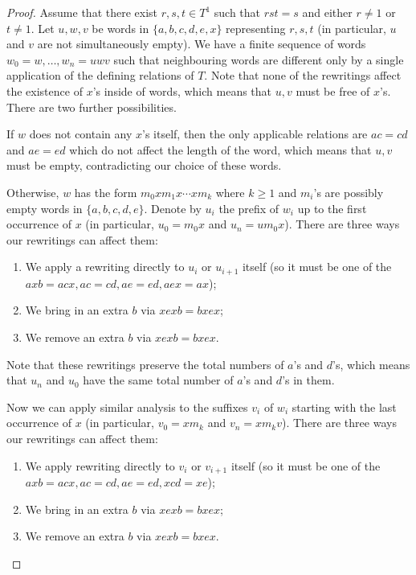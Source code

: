 \documentclass{article}
\theoremstyle{definition}
\begin{document}
\begin{proof}
Assume that there exist $r,s,t \in T^1$ such that $rst=s$ and either $r \neq 1$ or $t \neq 1$. Let $u,w,v$ be words in $\{a,b,c,d,e,x \}$ representing $r,s,t$ (in particular, $u$ and $v$ are not simultaneously empty). We have a finite sequence of words $w_0 = w, \ldots, w_n = u w v$ such that neighbouring words are different only by a single application of the defining relations of $T$. Note that none of the rewritings affect the existence of $x$'s inside of words, which means that $u,v$ must be free of $x$'s. There are two further possibilities.

If $w$ does not contain any $x$'s itself, then the only applicable relations are $ac = cd$ and $ae = ed$ which do not affect the length of the word, which means that $u,v$ must be empty, contradicting our choice of these words.

Otherwise, $w$ has the form $m_0 x m_1 x \cdots x m_k$ where $k \ge 1$ and $m_i$'s are possibly empty words in $\{a,b,c,d,e\}$. Denote by $u_i$ the prefix of $w_i$ up to the first occurrence of $x$ (in particular, $u_0 = m_0 x$ and $u_n = u m_0 x$). There are three ways our rewritings can affect them:

\begin{enumerate}
\item We apply a rewriting directly to $u_i$ or $u_{i+1}$ itself (so it must be one of the $axb = acx, ac=cd, ae = ed, aex = ax$);
\item We bring in an extra $b$ via $xexb = bxex$;
\item We remove an extra $b$ via $xexb = bxex$.
\end{enumerate}

Note that these rewritings preserve the total numbers of $a$'s and $d$'s, which means that $u_n$ and $u_0$ have the same total number of $a$'s and $d$'s in them.

Now we can apply similar analysis to the suffixes $v_i$ of $w_i$ starting with the last occurrence of $x$ (in particular, $v_0 =x m_k$ and $v_n = x m_k v$). There are three ways our rewritings can affect them:

\begin{enumerate}
\item We apply rewriting directly to $v_i$ or $v_{i+1}$ itself (so it must be one of the $axb = acx, ac=cd, ae = ed, xcd = xe$);
\item We bring in an extra $b$ via $xexb = bxex$;
\item We remove an extra $b$ via $xexb = bxex$.
\end{enumerate}


\end{proof}
\end{document}
